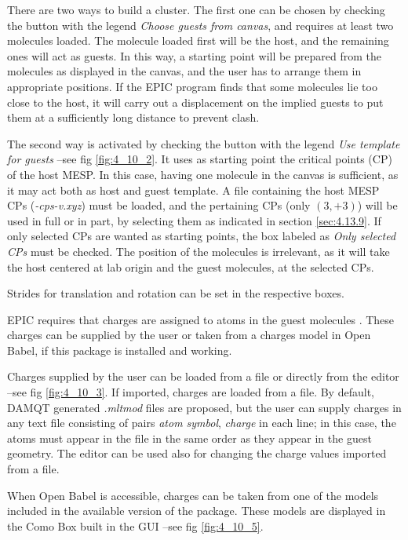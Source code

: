 \documentclass[10pt]{article}
\begin{document}
\vspace*{5mm}

There are two ways to build a cluster. The first one can be chosen by 
checking the button with the legend {\it  Choose guests from canvas}, and
requires at least two molecules loaded. The molecule loaded 
first will be the host, and the remaining ones will act as guests.
In this way, a starting point will be prepared from the molecules as 
displayed in the canvas, and the user has to arrange them in appropriate 
positions. If the EPIC program finds that some molecules lie too close
to the host, 
it will carry out a displacement on the implied guests to put them at a 
sufficiently long distance to prevent clash.

The second way is activated by checking the button with the legend
{\it Use template for guests} --see fig \ref{fig:4_10_2}. It
uses as starting point the critical points (CP) of the host MESP.
In this case, having one molecule in the canvas is sufficient, as it
may act both as host and guest template. A file containing the host 
MESP CPs ({\it *-cps-v.xyz})
must be loaded, and the pertaining CPs (only $(3,+3)$)
will be used in full or in part, by selecting them as indicated
in section \ref{sec:4.13.9}. If only selected CPs are wanted as starting 
points, the box labeled as {\it Only selected CPs} must be checked.
The position of the molecules is irrelevant, as it will take
the host centered at lab origin and the guest molecules, at the 
selected CPs.

Strides for translation and rotation can be set in the respective 
boxes.

EPIC requires that charges are assigned to atoms in the guest molecules
.
These charges can be supplied by the user or taken from a charges model
in Open Babel, if this package is installed and working.

Charges supplied by the user can be loaded from a file or directly from 
the editor --see fig \ref{fig:4_10_3}. If imported, charges are loaded
from a file. By default, DAMQT generated {\it .mltmod} 
files are proposed, but the user can supply charges in any 
text file consisting of pairs {\it atom symbol}, {\it charge} in each 
line; in this case, the atoms must appear in the file in the same order
as they appear in the guest geometry. The editor can be used also
for changing the charge values imported from a file.

When Open Babel is accessible, charges can be taken from one of the models
included in the available version of the package. These models
are displayed in the Como Box built in the GUI 
--see fig \ref{fig:4_10_5}.
 
\end{document}
